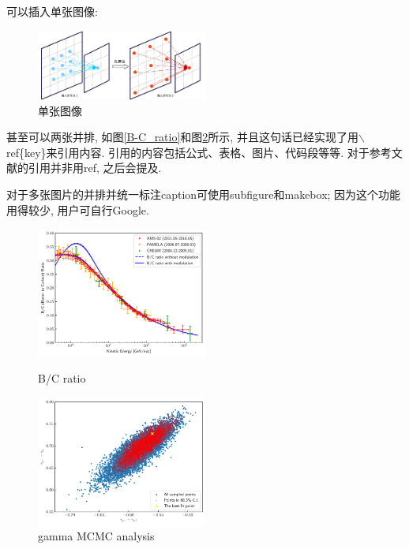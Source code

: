 \documentclass[a4paper]{article}
\begin{document}
\begin{spacing}{1.5}
可以插入单张图像:
\begin{figure}[h]
\centering
\includegraphics[width=0.5\textwidth]{images/Chap2/hole.pdf}
\caption{单张图像}
\label{fig:hole}
\end{figure}

甚至可以两张并排, 如图\ref{B-C_ratio}和图\ref{fig:gamma_MCMCanalysis}所示, 并且这句话已经实现了用$\backslash$ref\{key\}来引用内容. 引用的内容包括公式、表格、图片、代码段等等. 对于参考文献的引用并非用ref, 之后会提及.

对于多张图片的并排并统一标注caption可使用subfigure和makebox; 因为这个功能用得较少, 用户可自行Google.

\begin{figure}[th]
\parbox[t]{0.5\textwidth}{
\includegraphics[width=0.5\textwidth]{images/Chap2/B-C_ratio.pdf}
\caption{B/C ratio}
\label{B-C_ratio}
}
\parbox[t]{0.5\textwidth}{
\includegraphics[width=0.5\textwidth]{images/Chap2/gamma_MCMCanalysis.pdf}
\caption{gamma MCMC analysis}
\label{fig:gamma_MCMCanalysis}
}
\end{figure}


\end{spacing}
\end{document}

